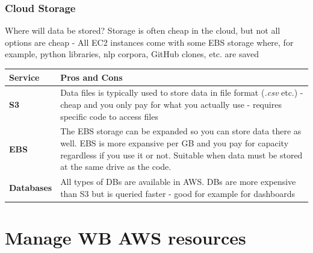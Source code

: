\documentclass[aspectratio=169]{beamer} %
\begin{document}
\begin{frame}
	\frametitle{Cloud Storage}
	
	Where will data be stored? Storage is often cheap in the cloud, but not all options are cheap - All EC2 instances come with some EBS storage where, for example, python libraries, nlp corpora,  GitHub clones, etc. are saved
	\vspace{-.5cm}
	\begin{table}
		\begin{tabular}{p{}p{}}
			Service & Pros and Cons\\
			\hline \hline
			\textbf{S3} & Data files is typically used to store data in file format (\textit{.csv} etc.) - cheap and you only pay for what you actually use - requires specific code to access files\\[.2cm] 
			\textbf{EBS} & The EBS storage can be expanded so you can store data there as well. EBS is more expansive per GB and you pay for capacity regardless if you use it or not. Suitable when data must be stored at the same drive as the code.\\[.2cm]
			\textbf{Databases} & All types of DBs are available in AWS. DBs are more expensive than S3 but is queried faster - good for example for dashboards
		\end{tabular}
	\end{table}
	
\end{frame}

\section{Manage WB AWS resources}
\end{document}
